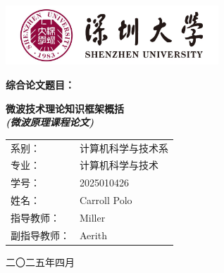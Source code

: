 
\begin{titlepage}
	\centering

	\includegraphics[width=0.6\textwidth]{img/SZU_logo.png} \\
	\vspace{0.5cm} %
	
	\LARGE\bfseries
	综合论文题目： \\
	\vspace{0.5cm} %
	
	\large\bfseries
	微波技术理论知识框架概括 \\
	\textit{(微波原理课程论文)} \\
	
	\vspace{2cm} %
	
	\begin{tabular}{l l}
		系别： & 计算机科学与技术系 \\
		专业： & 计算机科学与技术 \\
		学号： & 2025010426 \\
		姓名： & Carroll Polo \\
		指导教师： & Miller  \\
		副指导教师： & Aerith  \\
	\end{tabular}
	
	\vfill %
	
	\large
	二〇二五年四月 \\
\end{titlepage}



	
